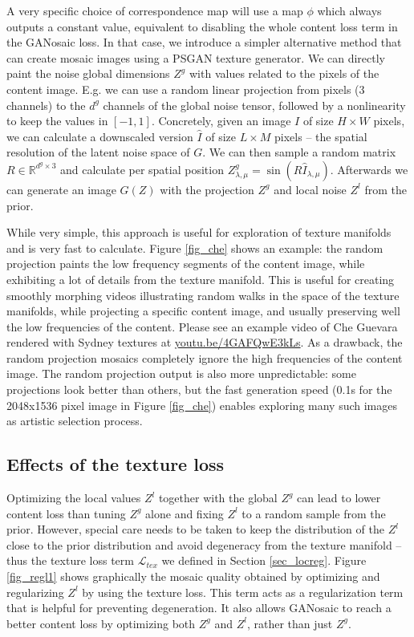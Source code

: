 \documentclass{article}
\begin{document}
A very specific choice of correspondence map will use a map $\phi$ which always outputs a constant value, equivalent to disabling the whole content loss term in the GANosaic loss.
In that case, we introduce a simpler alternative method that can create mosaic images using a PSGAN texture generator. We can directly paint the noise global dimensions $Z^g$ with values related to the pixels of the content image. 
E.g. we can use a random linear projection from pixels (3 channels) to the $d^g$ channels of the global noise tensor, followed by a nonlinearity to keep the values in $[-1,1]$. 
Concretely, given an image $I$ of size $H \times W$ pixels, we can calculate a downscaled version $\hat{I}$ of size $L \times M$ pixels -- the spatial resolution of the latent noise space of $G$.
We can then sample a random matrix $R \in \mathbb{R}^{d^g \times 3}$ and calculate per spatial position $Z^g_{\lambda,\mu} = \sin(R\hat{I}_{\lambda,\mu})$. 
Afterwards we can generate an image $G(Z)$ with the projection $Z^g$ and local noise $Z^l$ from the prior.

While very simple, this approach is useful for exploration of texture manifolds and is very fast to calculate. 
Figure \ref{fig_che} shows an example: the random projection paints the low frequency segments of the content image, while exhibiting a lot of details from the texture manifold. This is useful for creating smoothly morphing videos illustrating random walks in the space of the texture manifolds, while projecting a specific content image, and usually preserving well the low frequencies of the content. Please see an example video of Che Guevara rendered with Sydney textures at \url{youtu.be/4GAFQwE3kLs}.
As a drawback, the random projection mosaics completely ignore the high frequencies of the content image. The random projection output is also more unpredictable: some projections look better than others, but the fast generation speed (0.1s for the 2048x1536 pixel image in Figure \ref{fig_che}) enables exploring many such images as artistic selection process. 

\subsection{Effects of the texture loss}

Optimizing the local values $Z^l$ together with the global $Z^g$ can lead to lower content loss than tuning $Z^g$ alone and fixing $Z^l$ to a random sample from the prior. However, special care needs to be taken to keep the distribution of the $Z^l$ close to the prior distribution and avoid degeneracy from the texture manifold -- thus the texture loss term $\mathcal{L}_{tex}$ we defined in Section \ref{sec_locreg}.
Figure \ref{fig_regl1} shows graphically the mosaic quality obtained by optimizing and regularizing $Z^l$ by using the texture loss. This term acts as a regularization term that is helpful for preventing degeneration. It also allows GANosaic to reach a better content loss by optimizing both $Z^g$ and $Z^l$, rather than just $Z^g$. 
\end{document}
